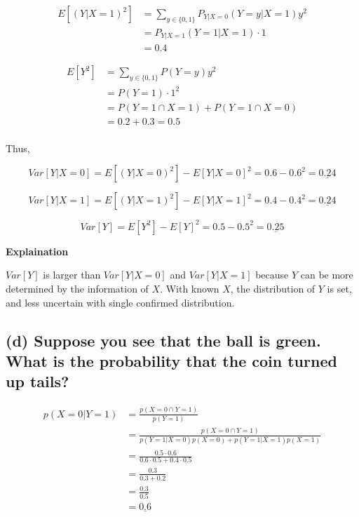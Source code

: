 \documentclass[
  letterpaper,
  DIV=11,
  numbers=noendperiod]{scrreprt}
\begin{document}
\[
\begin{aligned}
    E[(Y|X=1)^2] &= \sum_{y \in\{0,1\}} P_{Y|X=0}(Y=y|X=1)y^2\\
             &= P_{Y|X=1}(Y=1|X=1)\cdot 1 \\ 
             &= 0.4
\end{aligned}
\]

\[
\begin{aligned}
    E[Y^2] &= \sum_{y\in\{0,1\}} P(Y=y)y^2\\ 
           &= P(Y=1)\cdot 1^2\\ 
           &= P(Y=1 \cap X=1) + P(Y=1 \cap X=0)\\ 
           &= 0.2 + 0.3 = 0.5\\
\end{aligned}
\]

Thus,

\[Var[Y|X=0] = E[(Y|X=0)^2] - E[Y|X=0]^2 = 0.6 - 0.6^2 = \underline{0.24}\]

\[Var[Y|X=1] = E[(Y|X=1)^2] - E[Y|X=1]^2 = 0.4 - 0.4^2 = \underline{0.24}\]

\[Var[Y] = E[Y^2] - E[Y]^2 = 0.5 - 0.5^2 = \underline{0.25}\]

\textbf{Explaination}

\(Var[Y]\) is larger than \(Var[Y|X=0]\) and \(Var[Y|X=1]\) because
\(Y\) can be more determined by the information of \(X\). With known
\(X\), the distribution of \(Y\) is set, and less uncertain with single
confirmed distribution.

\hypertarget{d-suppose-you-see-that-the-ball-is-green.-what-is-the-probability-that-the-coin-turned-up-tails}{%
\subsection{(d) Suppose you see that the ball is green. What is the
probability that the coin turned up
tails?}\label{d-suppose-you-see-that-the-ball-is-green.-what-is-the-probability-that-the-coin-turned-up-tails}}

\[\begin{aligned}
    p(X=0 | Y=1) &= \frac{p(X=0 \cap Y=1)}{p(Y=1)}\\
                 &= \frac{p(X=0 \cap Y=1)}{p(Y=1 | X=0)p(X=0) + p(Y=1|X=1)p(X=1)}\\
                 &= \frac{0.5 \cdot 0.6}{0.6\cdot 0.5 + 0.4\cdot 0.5}\\ 
                 &= \frac{0.3}{0.3+0.2}\\ 
                 &= \frac{0.3}{0.5}\\ 
                 &= \underline{0.6}\\
\end{aligned}\]
\end{document}
